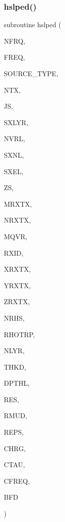 \subsubsection{\texorpdfstring{hslped()}{hslped()}}
{\footnotesize\ttfamily subroutine hslped (\begin{DoxyParamCaption}\item[{integer}]{N\+F\+RQ,  }\item[{real, dimension(nfrq)}]{F\+R\+EQ,  }\item[{integer}]{S\+O\+U\+R\+C\+E\+\_\+\+T\+Y\+PE,  }\item[{integer}]{N\+TX,  }\item[{integer}]{JS,  }\item[{integer}]{S\+X\+L\+YR,  }\item[{integer}]{N\+V\+RL,  }\item[{real, dimension(nvrl)}]{S\+X\+NL,  }\item[{real, dimension(nvrl)}]{S\+X\+EL,  }\item[{real(kind=ql)}]{ZS,  }\item[{integer}]{M\+R\+X\+TX,  }\item[{integer, dimension(ntx)}]{N\+R\+X\+TX,  }\item[{integer}]{M\+Q\+VR,  }\item[{integer, dimension(mrxtx,ntx)}]{R\+X\+ID,  }\item[{real, dimension(mrxtx,ntx,mqvr)}]{X\+R\+X\+TX,  }\item[{real, dimension(mrxtx,ntx,mqvr)}]{Y\+R\+X\+TX,  }\item[{real, dimension(mrxtx,ntx)}]{Z\+R\+X\+TX,  }\item[{integer}]{N\+R\+HS,  }\item[{real, dimension(nrhs)}]{R\+H\+O\+T\+RP,  }\item[{integer}]{N\+L\+YR,  }\item[{real(kind=ql), dimension(nlyr)}]{T\+H\+KD,  }\item[{real(kind=ql), dimension(nlyr)}]{D\+P\+T\+HL,  }\item[{real, dimension(nlyr)}]{R\+ES,  }\item[{real(kind=ql), dimension(0\+:nlyr)}]{R\+M\+UD,  }\item[{real, dimension(nlyr)}]{R\+E\+PS,  }\item[{real, dimension(nlyr)}]{C\+H\+RG,  }\item[{real, dimension(nlyr)}]{C\+T\+AU,  }\item[{real, dimension(nlyr)}]{C\+F\+R\+EQ,  }\item[{complex, dimension(nfrq,mrxtx,ntx,3)}]{B\+FD }\end{DoxyParamCaption})}

